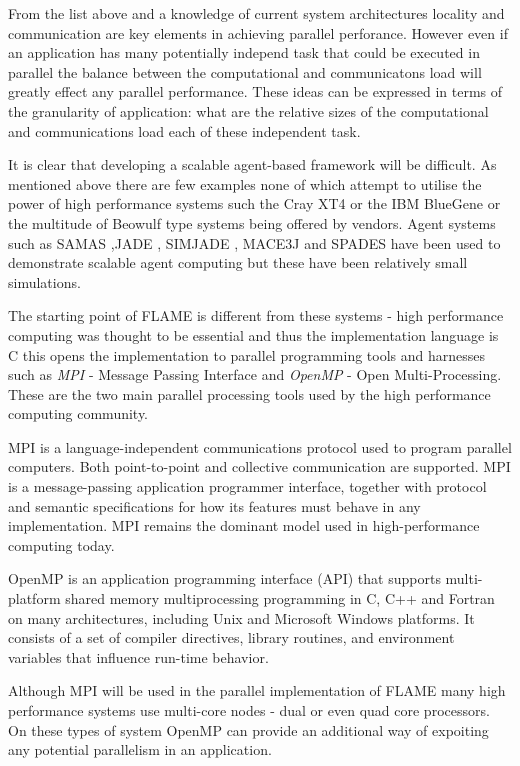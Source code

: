 From the list above and a knowledge of current system architectures locality and communication are key elements in achieving parallel perforance. However even if an application has many potentially independ task that could be executed in parallel the balance between the computational and communicatons load will greatly effect any parallel performance. These ideas can be expressed in terms of the granularity of application: what are the relative sizes of the computational and communications load each of these independent task.

It is clear that developing a scalable agent-based framework will be difficult. As mentioned above there are few examples none of which attempt to utilise the power of high performance systems such the Cray XT4 or the IBM BlueGene or the multitude of Beowulf type systems being offered by vendors. Agent systems such as SAMAS \cite{SAMAS},JADE \cite {JADE}, SIMJADE \cite{SIMJADE}, MACE3J \cite{MACE3J} and SPADES \cite{SPADES} have been used to demonstrate scalable agent computing but these have been relatively small simulations.

The starting point of FLAME is different from these systems - high performance computing was thought to be essential and thus the implementation language is C this opens the implementation to parallel programming tools and harnesses such as \textit{MPI} - Message Passing Interface and \textit{OpenMP} - Open Multi-Processing. These are the two main parallel processing tools used by the high performance computing community. 

MPI is a language-independent communications protocol used to program parallel computers. Both point-to-point and collective communication are supported. MPI is a message-passing application programmer interface, together with protocol and semantic specifications for how its features must behave in any implementation. MPI remains the dominant model used in high-performance computing today.

OpenMP is an application programming interface (API) that supports multi-platform shared memory multiprocessing programming in C, C++ and Fortran on many architectures, including Unix and Microsoft Windows platforms. It consists of a set of compiler directives, library routines, and environment variables that influence run-time behavior.

Although MPI will be used in the parallel implementation of FLAME many high performance systems use multi-core nodes - dual or even quad core processors. On these types of system OpenMP can provide an additional way of expoiting any potential parallelism in an application. 
